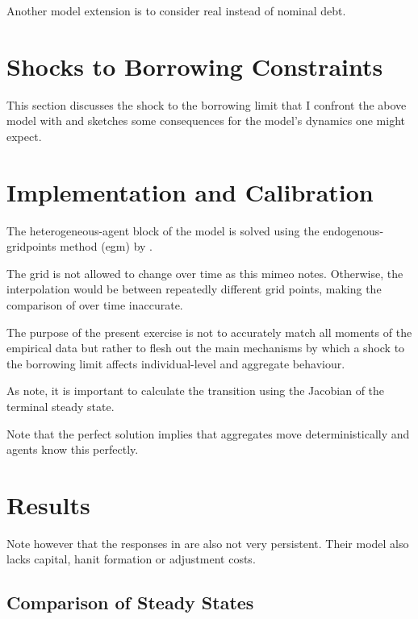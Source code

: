 \documentclass[12pt]{article} %
\numberwithin{equation}{section} %
\begin{document}
Another model extension is to consider real instead of nominal debt. 

\section{Shocks to Borrowing Constraints}
\label{sec:shocks}

This section discusses the shock to the borrowing limit that I confront the above model with and sketches some consequences for the model's dynamics one might expect.

\section{Implementation and Calibration}
\label{sec:implementation}

The heterogeneous-agent block of the model is solved using the endogenous-gridpoints method (\Gls{egm}) by \textcite{carroll2006}.

The grid is not allowed to change over time as this mimeo notes. Otherwise, the interpolation would be between repeatedly different grid points, making the comparison of over time inaccurate. 

The purpose of the present exercise is not to accurately match all moments of the empirical data but rather to flesh out the main mechanisms by which a shock to the borrowing limit affects individual-level and aggregate behaviour.

As \textcite{auclert2021} note, it is important to calculate the transition using the Jacobian of the terminal steady state.

Note that the perfect solution implies that aggregates move deterministically and agents know this perfectly.

\section{Results}
\label{sec:results}

Note however that the responses in \textcite{gl2017} are also not very persistent. Their model also lacks capital, hanit formation or adjustment costs.

\subsection{Comparison of Steady States}
\label{sec:results-stst}
\end{document}
